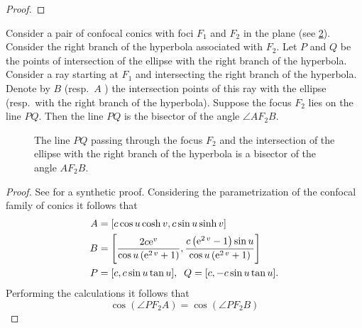 \begin{figure} 
	\begin{center}
		\def\svgwidth{0.55\textwidth}
		
		\caption {   }
	\end{center}
	\label{fig:elipse_circulo}
\end{figure}
\begin{proof}


\end{proof}


\begin{theorem}%
Consider a pair of confocal conics with foci $F_1$ and $F_2$ in the plane (see   \cref{fig:galperin}).
  Consider  the right branch of the hyperbola associated with $F_2$. Let $P$
and $Q$ be the points of intersection of the ellipse with the right branch of the hyperbola.
Consider a ray starting at $F_1$ and intersecting the right branch of the hyperbola. Denote
by $B$ (resp.\ $A$ ) the intersection points of this ray with the ellipse (resp.\  with the right branch of the
hyperbola). Suppose the focus $F_2$ lies on the line $P Q$. Then the line $P Q$ is the bisector of the
angle $  \angle  AF_2B$.  
\end{theorem}
\begin{figure} 
	\begin{center}
		\def\svgwidth{0.75\textwidth}
 	
		\caption { The line $PQ$ passing through the focus $F_2$ and the intersection of the ellipse with the right branch of the hyperbola  is a bisector of the angle $AF_2B$.}
		 \label{fig:galperin}
	\end{center}
\end{figure}
\begin{proof}
See \cite{dolgirev2014} for a synthetic proof.
Considering the parametrization of the confocal family  of conics it follows that
\begin{align*}
    A&=[c\cos u\cosh v,c \sin u \sinh v]\\
    B&=\left[ {\frac {2c{{\rm e}^{v}}}{\cos u \left( {
{\rm e}^{2\,v}}+1 \right) }},{\frac { c \left( {{\rm e}^{2\,v}}-1
 \right) \sin u  }{\cos u
 \left( {{\rm e}^{2\,v}}+1 \right) }}\right]\\
    P&=[c,c\sin u\tan u],\;\;Q=[c,-c\sin u\tan u].  
\end{align*}
Performing the calculations it follows that
\[\cos(\angle PF_2A)=\cos(\angle PF_2B)\]
\end{proof}

